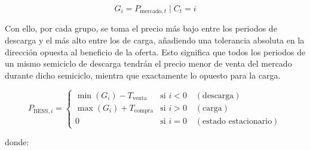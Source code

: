 \begin{equation}
  \label{eq:agrupado-periodos}
  G_{i} = { P_{\text{mercado}, t} \mid C_{t} = i }
\end{equation}

Con ello, por cada grupo, se toma el precio más bajo entre los periodos de descarga y el más alto entre los de carga, añadiendo una tolerancia absoluta en la dirección opuesta al beneficio de la oferta. Esto significa que todos los periodos de un mismo semiciclo de descarga tendrán el precio menor de venta del mercado durante dicho semiciclo, mientra que exactamente lo opuesto para la carga.

\begin{equation}
  P_{\text{BESS}, i} =
  \begin{cases}
    \min(G_{i}) - T_{\text{venta}}  & \text{si } i < 0 \quad (\text{descarga})\\
    \max(G_{i}) + T_{\text{compra}} & \text{si } i > 0 \quad (\text{carga})\\
    0                               & \text{si } i = 0 \quad (\text{estado estacionario})
  \end{cases}
\end{equation}

donde:

